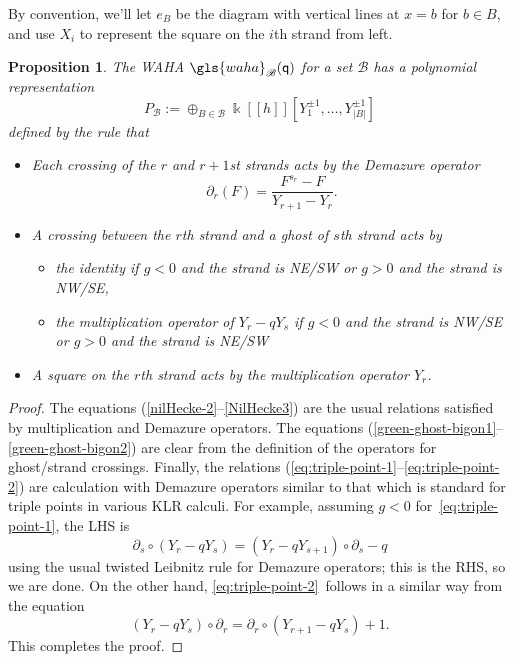 \documentclass[10pt]{article}
\newtheorem{prop}[theorem]{Proposition}
\theoremstyle{definition}
\newcommand{\ck}{g}
\newcommand{\pq}{\mathsf{q}}
\newcommand{\K}{\Bbbk}%
\newcommand{\waha}{\gls{waha}}
\newcommand\llbracket{[\![}
\newcommand\rrbracket{]\!]}
\begin{document}
By convention, we'll let $e_{B}$ be the diagram with vertical lines at
$x=b$ for $b\in B$, and use $X_i$ to represent the square on the $i$th
strand from left.
\begin{prop}\label{W-poly}
 The WAHA $\waha_{\mathscr{B}}(\pq)$ for a set $\mathscr{B}$ has a polynomial representation
 \[P_{\mathscr{B}} := \oplus_{B\in \mathscr{B}}\K\llbracket h\rrbracket [Y_1^{\pm 1},\dots,
 Y_{|B|}^{\pm 1}]\]
defined by the rule that 
\begin{itemize}
\item Each crossing of the $r$ and $r+1$st strands acts by the Demazure operator \[\partial_r(F)=
 \frac{F^{s_r}-F}{Y_{r+1}-Y_{r}}.\]
\item 
A crossing between the $r$th strand and a ghost of $s$th strand acts
by
\begin{itemize}
\item the identity if $\ck <0$ and the
 strand is NE/SW or $\ck >0$ and the strand is NW/SE,
\item the multiplication operator of $Y_r-qY_s$ if $\ck <0$ and
 the strand is NW/SE or $\ck >0$ and the strand is NE/SW
\end{itemize}
\item A square on the $r$th strand acts by the multiplication operator
 $Y_r$. 
\end{itemize}
\end{prop}
\begin{proof}
The equations (\ref{nilHecke-2}--\ref{NilHecke3}) are the usual
relations satisfied by multiplication and Demazure operators. The 
equations (\ref{green-ghost-bigon1}--\ref{green-ghost-bigon2}) are clear from
the definition of the operators for ghost/strand crossings. Finally,
the relations (\ref{eq:triple-point-1}--\ref{eq:triple-point-2}) are
calculation with Demazure operators similar to that which is standard
for triple points in various KLR calculi.
For example, assuming $\ck<0$ for~\eqref{eq:triple-point-1}, the
LHS is \[\partial_s\circ (Y_r-qY_s)=(Y_r-qY_{s+1})\circ\partial_s-q\]
using the usual twisted Leibnitz rule for Demazure operators; this is
the RHS, so we are done. On the other hand,
\eqref{eq:triple-point-2}~follows in a similar way from the equation
\[(Y_r-qY_s)\circ\partial_r = \partial_r \circ (Y_{r+1}-qY_s)+1.\] This
completes the proof.
\end{proof}
\end{document}
